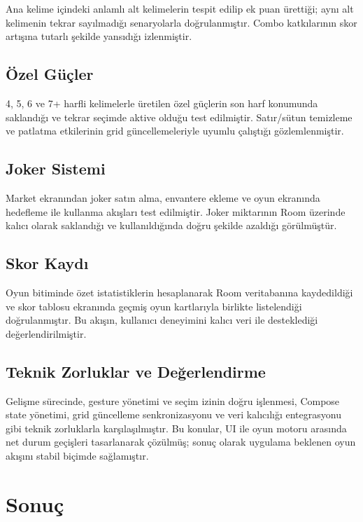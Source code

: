 \documentclass[conference]{IEEEtran}
\begin{document}
Ana kelime içindeki anlamlı alt kelimelerin tespit edilip
ek puan ürettiği; aynı alt kelimenin tekrar sayılmadığı
senaryolarla doğrulanmıştır. Combo katkılarının skor
artışına tutarlı şekilde yansıdığı izlenmiştir.

\subsection{Özel Güçler}

4, 5, 6 ve 7+ harfli kelimelerle üretilen özel güçlerin
son harf konumunda saklandığı ve tekrar seçimde aktive
olduğu test edilmiştir. Satır/sütun temizleme ve
patlatma etkilerinin grid güncellemeleriyle uyumlu
çalıştığı gözlemlenmiştir.

\subsection{Joker Sistemi}

Market ekranından joker satın alma, envantere ekleme
ve oyun ekranında hedefleme ile kullanma akışları
test edilmiştir. Joker miktarının Room üzerinde
kalıcı olarak saklandığı ve kullanıldığında doğru
şekilde azaldığı görülmüştür.

\subsection{Skor Kaydı}

Oyun bitiminde özet istatistiklerin hesaplanarak Room
veritabanına kaydedildiği ve skor tablosu ekranında
geçmiş oyun kartlarıyla birlikte listelendiği doğrulanmıştır.
Bu akışın, kullanıcı deneyimini kalıcı veri ile
desteklediği değerlendirilmiştir.

\subsection{Teknik Zorluklar ve Değerlendirme}

Gelişme sürecinde, gesture yönetimi ve seçim izinin
doğru işlenmesi, Compose state yönetimi, grid güncelleme
senkronizasyonu ve veri kalıcılığı entegrasyonu gibi
teknik zorluklarla karşılaşılmıştır. Bu konular, UI ile
oyun motoru arasında net durum geçişleri tasarlanarak
çözülmüş; sonuç olarak uygulama beklenen oyun akışını
stabil biçimde sağlamıştır.

\section{Sonuç}
\end{document}
